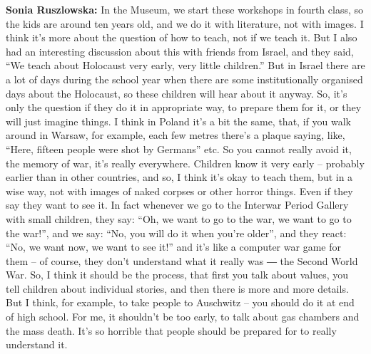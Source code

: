 \textbf{Sonia Ruszlowska:} In the Museum, we start these workshops in fourth class, so the kids are around ten years old, and we do it with literature, not with images. I think it’s more about the question of how to teach, not if we teach it. But I also had an interesting discussion about this with friends from Israel, and they said, ``We teach about Holocaust very early, very little children.'' But in Israel there are a lot of days during the school year when there are some institutionally organised days about the Holocaust, so these children will hear about it anyway. So, it’s only the question if they do it in appropriate way, to prepare them for it, or they will just imagine things. I think in Poland it’s a bit the same, that, if you walk around in Warsaw, for example, each few metres there’s a plaque saying, like, ``Here, fifteen people were shot by Germans'' etc. So you cannot really avoid it, the memory of war, it’s really everywhere. Children know it very early – probably earlier than in other countries, and so, I think it’s okay to teach them, but in a wise way, not with images of naked corpses or other horror things. Even if they say they want to see it.  In fact whenever we go to the Interwar Period Gallery with small children, they say: ``Oh, we want to go to the war, we want to go to the war!'', and we say: ``No, you will do it when you’re older'', and they react: ``No, we want now, we want to see it!'' and it’s like a computer war game for them – of course, they don’t understand what it really was ― the Second World War. So, I think it should be the process, that first you talk about values, you tell children about individual stories, and then there is more and more details. But I think, for example, to take people to Auschwitz – you should do it at end of high school. For me, it shouldn’t be too early, to talk about gas chambers and the mass death. It’s so horrible that people should be prepared for to really understand it.  